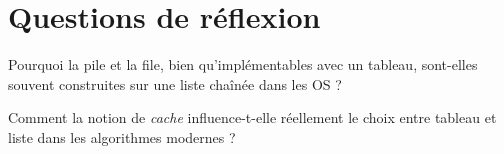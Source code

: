\section*{Questions de réflexion}

\begin{reflexion}
Pourquoi la pile et la file, bien qu’implémentables avec un tableau,
sont-elles souvent construites sur une liste chaînée dans les OS ?
\end{reflexion}

\begin{reflexion}
Comment la notion de \emph{cache} influence-t-elle réellement le choix
entre tableau et liste dans les algorithmes modernes ?
\end{reflexion}

